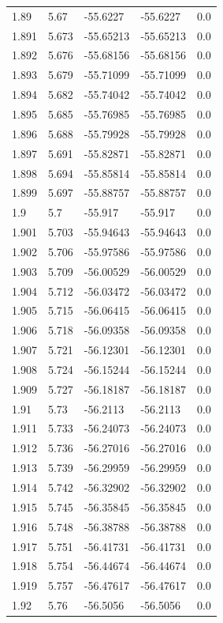 \begin{tabular}{lllll}
1.89 & 5.67 & -55.6227 & -55.6227 & 0.0 \\
1.891 & 5.673 & -55.65213 & -55.65213 & 0.0 \\
1.892 & 5.676 & -55.68156 & -55.68156 & 0.0 \\
1.893 & 5.679 & -55.71099 & -55.71099 & 0.0 \\
1.894 & 5.682 & -55.74042 & -55.74042 & 0.0 \\
1.895 & 5.685 & -55.76985 & -55.76985 & 0.0 \\
1.896 & 5.688 & -55.79928 & -55.79928 & 0.0 \\
1.897 & 5.691 & -55.82871 & -55.82871 & 0.0 \\
1.898 & 5.694 & -55.85814 & -55.85814 & 0.0 \\
1.899 & 5.697 & -55.88757 & -55.88757 & 0.0 \\
1.9 & 5.7 & -55.917 & -55.917 & 0.0 \\
1.901 & 5.703 & -55.94643 & -55.94643 & 0.0 \\
1.902 & 5.706 & -55.97586 & -55.97586 & 0.0 \\
1.903 & 5.709 & -56.00529 & -56.00529 & 0.0 \\
1.904 & 5.712 & -56.03472 & -56.03472 & 0.0 \\
1.905 & 5.715 & -56.06415 & -56.06415 & 0.0 \\
1.906 & 5.718 & -56.09358 & -56.09358 & 0.0 \\
1.907 & 5.721 & -56.12301 & -56.12301 & 0.0 \\
1.908 & 5.724 & -56.15244 & -56.15244 & 0.0 \\
1.909 & 5.727 & -56.18187 & -56.18187 & 0.0 \\
1.91 & 5.73 & -56.2113 & -56.2113 & 0.0 \\
1.911 & 5.733 & -56.24073 & -56.24073 & 0.0 \\
1.912 & 5.736 & -56.27016 & -56.27016 & 0.0 \\
1.913 & 5.739 & -56.29959 & -56.29959 & 0.0 \\
1.914 & 5.742 & -56.32902 & -56.32902 & 0.0 \\
1.915 & 5.745 & -56.35845 & -56.35845 & 0.0 \\
1.916 & 5.748 & -56.38788 & -56.38788 & 0.0 \\
1.917 & 5.751 & -56.41731 & -56.41731 & 0.0 \\
1.918 & 5.754 & -56.44674 & -56.44674 & 0.0 \\
1.919 & 5.757 & -56.47617 & -56.47617 & 0.0 \\
1.92 & 5.76 & -56.5056 & -56.5056 & 0.0 \\

\end{tabular}
